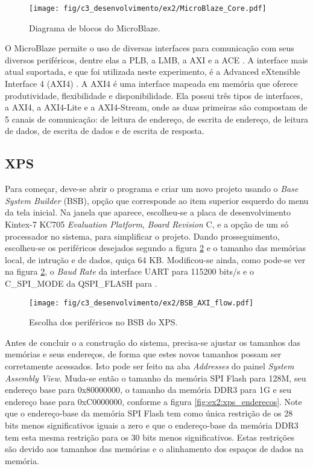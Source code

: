 \documentclass[11pt,a4paper,oneside]{book}
\begin{document}
\begin{figure}[h]
\centering
\texttt{[image: fig/c3\_desenvolvimento/ex2/MicroBlaze\_Core.pdf]}
\caption{Diagrama de blocos do MicroBlaze.}
\label{fig:ex3:microblazecore}
\end{figure}

O MicroBlaze permite o uso de diversas interfaces para comunicação com seus diversos periféricos, dentre elas a PLB, a LMB, a AXI e a ACE \cite{ug081}.
A interface mais atual suportada, e que foi utilizada neste experimento, é a Advanced eXtensible Interface 4 (AXI4) \cite{ug081, ug761}.
A AXI4 é uma interface mapeada em memória que oferece produtividade, flexibilidade e disponibilidade.
Ela possui três tipos de interfaces, a AXI4, a AXI4-Lite e a AXI4-Stream, onde as duas primeiras são compostam de 5 canais de comunicação: de leitura de endereço, de escrita de endereço, de leitura de dados, de escrita de dados e de escrita de resposta.

\subsection{XPS}
Para começar, deve-se abrir o programa e criar um novo projeto usando o \textit{Base System Builder} (BSB), opção que corresponde ao item superior esquerdo do menu da tela inicial.
Na janela que aparece, escolheu-se a placa de desenvolvimento Kintex-7 KC705 \textit{Evaluation Platform}, \textit{Board Revision} C, e a opção de um só processador no sistema, para simplificar o projeto.
Dando prosseguimento, escolheu-se os periféricos desejados segundo a figura \ref{fig:ex2:bsb_prerifericos} e o tamanho das memórias local, de intrução e de dados, quiça 64 KB.
Modificou-se ainda, como pode-se ver na figura \ref{fig:ex2:bsb_prerifericos}, o \textit{Baud Rate} da interface UART para 115200 bits/s e o C\_SPI\_MODE da QSPI\_FLASH para .

\begin{figure}[htp]
\centering
\texttt{[image: fig/c3\_desenvolvimento/ex2/BSB\_AXI\_flow.pdf]}
\caption{Escolha dos periféricos no BSB do XPS.}
\label{fig:ex2:bsb_prerifericos}
\end{figure}

Antes de concluir o a construção do sistema, precisa-se ajustar os tamanhos das memórias e seus endereços, de forma que estes novos tamanhos possam ser corretamente acessados.
Isto pode ser feito na aba \textit{Addresses} do painel \textit{System Assembly View}.
Muda-se então o tamanho da memória SPI Flash para 128M, seu endereço base para 0x80000000, o tamanho da memória DDR3 para 1G e seu endereço base para 0xC0000000, conforme a figura \ref{fig:ex2:xps_enderecos}.
Note que o endereço-base da memória SPI Flash tem como única restrição de os 28 bits menos significativos iguais a zero e que o endereço-base da memória DDR3 tem esta mesma restrição para os 30 bits menos significativos.
Estas restrições são devido aos tamanhos das memórias e o alinhamento dos espaços de dados na memória.
\end{document}

